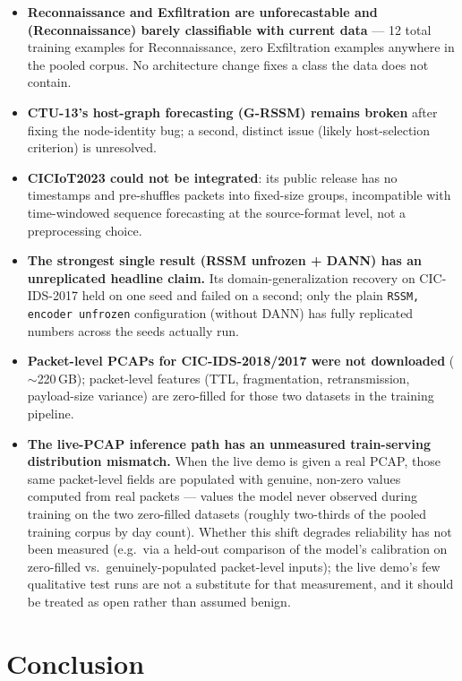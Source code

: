 \documentclass[11pt]{article}
\newcommand{\code}[1]{\texttt{#1}}
\begin{document}
\begin{itemize}[leftmargin=1.5em]
  \item \textbf{Reconnaissance and Exfiltration are unforecastable and (Reconnaissance) barely
  classifiable with current data} --- 12 total training examples for Reconnaissance, zero
  Exfiltration examples anywhere in the pooled corpus. No architecture change fixes a class the
  data does not contain.
  \item \textbf{CTU-13's host-graph forecasting (G-RSSM) remains broken} after fixing the
  node-identity bug; a second, distinct issue (likely host-selection criterion) is unresolved.
  \item \textbf{CICIoT2023 could not be integrated}: its public release has no timestamps and
  pre-shuffles packets into fixed-size groups, incompatible with time-windowed sequence
  forecasting at the source-format level, not a preprocessing choice.
  \item \textbf{The strongest single result (RSSM unfrozen + DANN) has an unreplicated headline
  claim.} Its domain-generalization recovery on CIC-IDS-2017 held on one seed and failed on a
  second; only the plain \code{RSSM, encoder unfrozen} configuration (without DANN) has fully
  replicated numbers across the seeds actually run.
  \item \textbf{Packet-level PCAPs for CIC-IDS-2018/2017 were not downloaded} ($\sim$220\,GB);
  packet-level features (TTL, fragmentation, retransmission, payload-size variance) are
  zero-filled for those two datasets in the training pipeline.
  \item \textbf{The live-PCAP inference path has an unmeasured train-serving distribution
  mismatch.} When the live demo is given a real PCAP, those same packet-level fields are
  populated with genuine, non-zero values computed from real packets --- values the model
  never observed during training on the two zero-filled datasets (roughly two-thirds of the
  pooled training corpus by day count). Whether this shift degrades reliability has not been
  measured (e.g.\ via a held-out comparison of the model's calibration on zero-filled vs.\
  genuinely-populated packet-level inputs); the live demo's few qualitative test runs are not
  a substitute for that measurement, and it should be treated as open rather than assumed
  benign.
\end{itemize}

\section{Conclusion}
\end{document}

